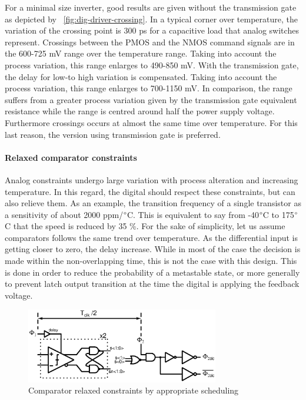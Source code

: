 For a minimal size inverter, good results are given without the transmission gate as depicted by \figurename~\ref{fig:dig-driver-crossing}. In a typical corner over temperature, the variation of the crossing point is 300 ps for a capacitive load that analog switches represent. Crossings between the PMOS and the NMOS command signals are in the 600-725 mV range over the temperature range. Taking into account the process variation, this range enlarges to 490-850 mV. With the transmission gate, the delay for low-to high variation is compensated. Taking into account the process variation, this range enlarges to 700-1150 mV. In comparison, the range suffers from a greater process variation given by the transmission gate equivalent resistance while the range is centred around half the power supply voltage. Furthermore crossings occurs at almost the same time over temperature. For this last reason, the version using transmission gate is preferred.
\paragraph{Relaxed comparator constraints}

Analog constraints undergo large variation with process alteration and increasing temperature. In this regard, the digital should respect these constraints, but can also relieve them. As an example, the transition frequency of a single transistor as a sensitivity of about 2000 ppm/\(\degree \)C. This is equivalent to say from -40\(\degree \)C to 175\(\degree \)C that the speed is reduced by 35 \%. For the sake of simplicity, let us assume comparators follows the same trend over temperature. As the differential input is getting closer to zero, the delay increase. While in most of the case the decision is made within the non-overlapping time, this is not the case with this design. This is done in order to reduce the probability of a metastable state, or more generally to prevent latch output transition at the time the digital is applying the feedback voltage.
\begin{figure}[htp]
	\centering
	\includegraphics[width=0.75\textwidth]{Chapter4/Figs/comp-timing-isd.ps}
	\caption{Comparator relaxed constraints by appropriate scheduling}
	\label{fig:comp-timing}
\end{figure}

